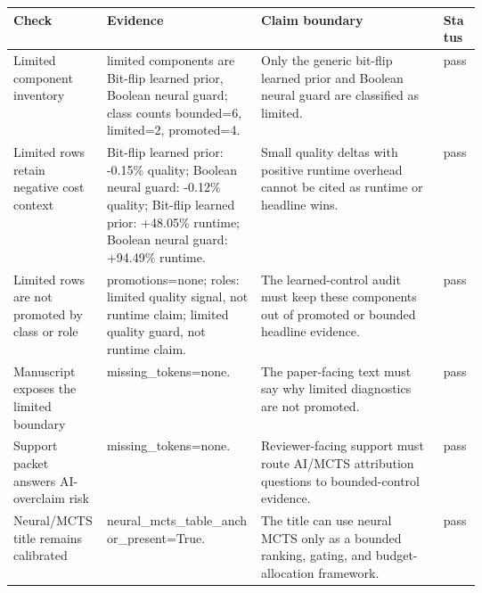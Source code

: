 \begin{tabularx}{\linewidth}{>{\raggedright\arraybackslash}p{0.20\linewidth}>{\raggedright\arraybackslash}p{0.33\linewidth}>{\raggedright\arraybackslash}X>{\raggedright\arraybackslash}p{0.08\linewidth}}
\toprule
Check & Evidence & Claim boundary & Status \\
\midrule
Limited component inventory & limited components are Bit-flip learned prior, Boolean neural guard; class counts bounded=6, limited=2, promoted=4. & Only the generic bit-flip learned prior and Boolean neural guard are classified as limited. & pass \\
Limited rows retain negative cost context & Bit-flip learned prior: -0.15\% quality; Boolean neural guard: -0.12\% quality; Bit-flip learned prior: +48.05\% runtime; Boolean neural guard: +94.49\% runtime. & Small quality deltas with positive runtime overhead cannot be cited as runtime or headline wins. & pass \\
Limited rows are not promoted by class or role & promotions=none; roles: limited quality signal, not runtime claim; limited quality guard, not runtime claim. & The learned-control audit must keep these components out of promoted or bounded headline evidence. & pass \\
Manuscript exposes the limited boundary & missing\_tokens=none. & The paper-facing text must say why limited diagnostics are not promoted. & pass \\
Support packet answers AI-overclaim risk & missing\_tokens=none. & Reviewer-facing support must route AI/MCTS attribution questions to bounded-control evidence. & pass \\
Neural/MCTS title remains calibrated & neural\_mcts\_table\_anchor\_present=True. & The title can use neural MCTS only as a bounded ranking, gating, and budget-allocation framework. & pass \\
\bottomrule
\end{tabularx}
